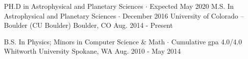 

\begin{cventries}

  \cventry
    {PH.D in Astrophysical and Planetary Sciences $\cdot$ Expected May 2020 
	\newline
	M.S. In Astrophysical and Planetary Sciences $\cdot$ December 2016} %
    {University of Colorado -- Boulder (CU Boulder)} %
    {Boulder, CO} %
    {Aug. 2014 - Present} %
    {}
    \vspace{-0.15in}

  \cventry
    {B.S. In Physics; Minors in Computer Science \& Math $\cdot$ Cumulative gpa 4.0/4.0}
    {Whitworth University}
    {Spokane, WA}
    {Aug. 2010 - May 2014}
    {}
    \vspace{-0.15in}

\end{cventries}
